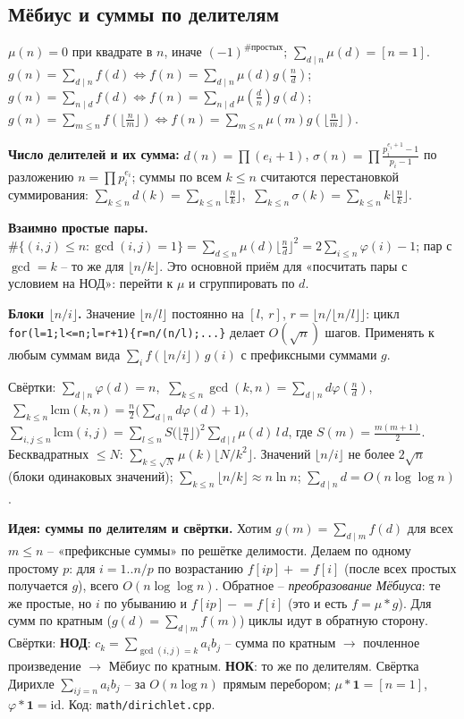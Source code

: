 \subsection{Мёбиус и суммы по делителям}
$\mu(n)=0$ при квадрате в $n$, иначе $(-1)^{\#\text{простых}}$; $\sum_{d\mid n}\mu(d)=[n=1]$.\\
$g(n)=\sum_{d\mid n}f(d)\iff f(n)=\sum_{d\mid n}\mu(d)g(\tfrac nd)$;\ \ $g(n)=\sum_{n\mid d}f(d)\iff f(n)=\sum_{n\mid d}\mu(\tfrac dn)g(d)$;\\
$g(n)=\sum_{m\le n}f(\lfloor\tfrac nm\rfloor)\iff f(n)=\sum_{m\le n}\mu(m)g(\lfloor\tfrac nm\rfloor)$.
\par \textbf{Число делителей и их сумма:} $d(n)=\prod(e_i{+}1)$, $\sigma(n)=\prod\frac{p_i^{e_i+1}-1}{p_i-1}$ по разложению $n=\prod p_i^{e_i}$; суммы по всем $k\le n$ считаются перестановкой суммирования: $\sum_{k\le n}d(k)=\sum_{k\le n}\lfloor\tfrac nk\rfloor$, $\ \sum_{k\le n}\sigma(k)=\sum_{k\le n}k\lfloor\tfrac nk\rfloor$.
\par \textbf{Взаимно простые пары.} $\#\{(i,j)\le n:\gcd(i,j)=1\}=\sum_{d\le n}\mu(d)\lfloor\tfrac nd\rfloor^2=2\sum_{i\le n}\varphi(i)-1$; пар с $\gcd=k$ -- то же для $\lfloor n/k\rfloor$. Это основной приём для «посчитать пары с условием на НОД»: перейти к $\mu$ и сгруппировать по $d$.
\par \textbf{Блоки $\lfloor n/i\rfloor$.} Значение $\lfloor n/l\rfloor$ постоянно на $[l,\ r]$, $r=\lfloor n/\lfloor n/l\rfloor\rfloor$: цикл \texttt{for(l=1;l<=n;l=r+1)\{r=n/(n/l);...\}} делает $O(\sqrt n)$ шагов. Применять к любым суммам вида $\sum_i f(\lfloor n/i\rfloor)\,g(i)$ с префиксными суммами $g$.
\par Свёртки: $\sum_{d\mid n}\varphi(d)=n$, $\ \sum_{k\le n}\gcd(k,n)=\sum_{d\mid n}d\varphi(\tfrac nd)$, $\ \sum_{k\le n}\mathrm{lcm}(k,n)=\frac n2\big(\sum_{d\mid n}d\varphi(d)+1\big)$,\\
$\sum_{i,j\le n}\mathrm{lcm}(i,j)=\sum_{l\le n}S\big(\lfloor\tfrac nl\rfloor\big)^2\sum_{d\mid l}\mu(d)\,l\,d$, где $S(m)=\frac{m(m+1)}2$.\\
Бесквадратных $\le N$: $\sum_{k\le\sqrt N}\mu(k)\lfloor N/k^2\rfloor$. Значений $\lfloor n/i\rfloor$ не более $2\sqrt n$ (блоки одинаковых значений); $\sum_{k\le n}\lfloor n/k\rfloor\approx n\ln n$; $\sum_{d\mid n}d=O(n\log\log n)$.
\par \textbf{Идея: суммы по делителям и свёртки.} Хотим $g(m)=\sum_{d\mid m}f(d)$ для всех $m\le n$ -- «префиксные суммы» по решётке делимости. Делаем по одному простому $p$: для $i=1..n/p$ по возрастанию $f[ip]\mathrel{+}=f[i]$ (после всех простых получается $g$), всего $O(n\log\log n)$. Обратное -- \emph{преобразование Мёбиуса}: те же простые, но $i$ по убыванию и $f[ip]\mathrel{-}=f[i]$ (это и есть $f=\mu*g$). Для сумм по кратным ($g(d)=\sum_{d\mid m}f(m)$) циклы идут в обратную сторону. Свёртки: \textbf{НОД}: $c_k=\sum_{\gcd(i,j)=k}a_ib_j$ -- сумма по кратным $\to$ почленное произведение $\to$ Мёбиус по кратным. \textbf{НОК}: то же по делителям. Свёртка Дирихле $\sum_{ij=n}a_ib_j$ -- за $O(n\log n)$ прямым перебором; $\mu*\mathbf1=[n{=}1]$, $\varphi*\mathbf1=\mathrm{id}$. Код: \texttt{math/dirichlet.cpp}.

